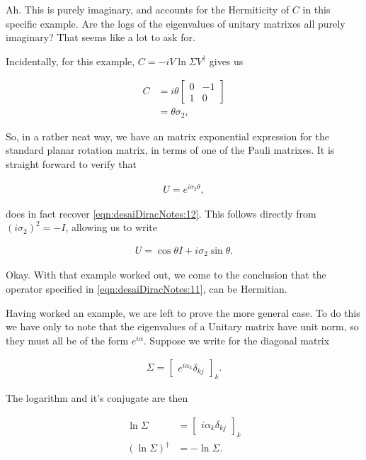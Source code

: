 Ah.  This is purely imaginary, and accounts for the Hermiticity of $C$ in this specific example.  Are the logs of the eigenvalues of unitary matrixes all purely imaginary?  That seems like a lot to ask for.

Incidentally, for this example, $C = -i V \ln \Sigma V^\dagger$ gives us

\begin{align*}
C &= i \theta 
\begin{bmatrix}
0 & -1 \\
1 & 0
\end{bmatrix} \\
&= \theta \sigma_2,
\end{align*}

So, in a rather neat way, we have an matrix exponential expression for the standard planar rotation matrix, in terms of one of the Pauli matrixes.  It is straight forward to verify that 

\begin{align}\label{eqn:desaiDiracNotes:13}
U = e^{i \sigma_2 \theta},
\end{align}

does in fact recover \ref{eqn:desaiDiracNotes:12}.  This follows directly from $(i \sigma_2)^2 = -I$, allowing us to write

\begin{align}\label{eqn:desaiDiracNotes:14}
U = \cos\theta I + i \sigma_2 \sin\theta.
\end{align}

Okay.  With that example worked out, we come to the conclusion that the operator specified in \ref{eqn:desaiDiracNotes:11}, can be Hermitian.

Having worked an example, we are left to prove the more general case.  To do this we have only to note that the eigenvalues of a Unitary matrix have unit norm, so they must all be of the form $e^{i\alpha}$.  Suppose we write for the diagonal matrix 

\begin{align}\label{eqn:desaiDiracNotes:11c}
\Sigma = 
{\begin{bmatrix}
e^{i\alpha_k} \delta_{kj}
\end{bmatrix}}_k.
\end{align}

The logarithm and it's conjugate are then

\begin{align}\label{eqn:desaiDiracNotes:11d}
\ln \Sigma &= 
{\begin{bmatrix}
i\alpha_k \delta_{kj}
\end{bmatrix}}_k \\
(\ln \Sigma)^\dagger &= -\ln \Sigma.
\end{align}

